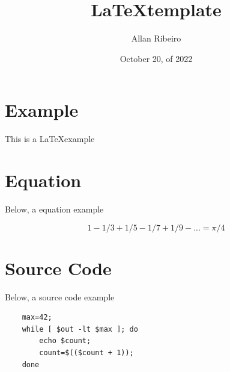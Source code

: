 \documentclass [12pt,oneside] {article}
\begin{document}
\title {\LaTeX template}
\author {Allan Ribeiro}
\date {October 20, of 2022}
\maketitle

\section{Example}

This is a \LaTeX example

\section{Equation}

Below, a equation example

\begin{equation}
1-1/3+1/5-1/7+1/9-... = \pi/4
\end{equation}
\section{Source Code}

Below, a source code example

\begin{footnotesize}
\begin{verbatim}
	max=42;
	while [ $out -lt $max ]; do
		echo $count;
		count=$(($count + 1));
	done
\end{verbatim}
\end{footnotesize}
\end{document}
